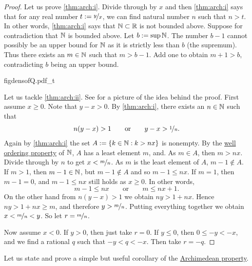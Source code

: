 \begin{proof}
Let us prove \ref{thm:arch:i}.  Divide through by $x$ and then 
\ref{thm:arch:i} says that for any real number $t:= \nicefrac{y}{x}$,
we can find natural number $n$ such that $n > t$.  In other words,
\ref{thm:arch:i} says that ${\mathbb{N}} \subset {\mathbb{R}}$ is not bounded above.
Suppose for contradiction that ${\mathbb{N}}$ is bounded above.  Let $b := \sup {\mathbb{N}}$.
The number $b-1$ cannot possibly be an upper bound for ${\mathbb{N}}$ as it is strictly
less than $b$ (the supremum).  Thus there exists an $m \in {\mathbb{N}}$ such that $m > b-1$.
Add one to obtain $m+1 > b$, contradicting $b$ being an
upper bound.

\begin{myfigureht}
{figdensofQ.pdf_t}
\caption{Idea of the proof of the density of $\Q$: Find $n$ such that $y-x >
\nicefrac{1}{n}$, then take the least $m$ such that $\nicefrac{m}{n} > x$.\label{figdensofQ}}
\end{myfigureht}
Let us tackle \ref{thm:arch:ii}.
See 
for a picture of the idea behind the proof.
First assume $x \geq 0$.
Note that $y-x > 0$.
By \ref{thm:arch:i}, there exists an $n \in {\mathbb{N}}$ such that
\begin{equation*}
n(y-x) > 1
\qquad \text{or} \qquad
y-x > \nicefrac{1}{n}.
\end{equation*}
Again by \ref{thm:arch:i} the set 
$A := \{ k \in {\mathbb{N}} : k > nx \}$ is nonempty.  By the
\hyperlink{wop:link}{well ordering property}
of ${\mathbb{N}}$, $A$ has a least element $m$, and.  As $m \in A$,
then $m > nx$.
Divide through by $n$ to get $x < \nicefrac{m}{n}$.
As $m$ is the least
element of $A$, $m-1 \notin A$.
If $m > 1$, then $m-1 \in {\mathbb{N}}$, but $m-1 \notin A$ and so $m-1 \leq nx$.
If $m=1$,
then $m-1 = 0$, and $m-1 \leq nx$ still holds as $x \geq 0$.
In other words,
\begin{equation*}
m-1 \leq nx \qquad \text{or} \qquad m \leq nx+1 .
\end{equation*}
On the other hand
from $n(y-x) > 1$ we obtain $ny > 1+nx$.
Hence $ny > 1+nx \geq m$, and therefore $y > \nicefrac{m}{n}$.
Putting everything together we obtain $x < \nicefrac{m}{n} < y$.
So let $r = \nicefrac{m}{n}$.

Now assume $x < 0$.  If $y > 0$, then just take $r=0$.  If
$y \leq 0$, then $0 \leq -y < -x$, and we
find a rational $q$ such that $-y < q < -x$.  Then take $r = -q$.
\end{proof}

Let us state and prove a simple but useful corollary of the
\hyperref[thm:arch:i]{Archimedean property}.

